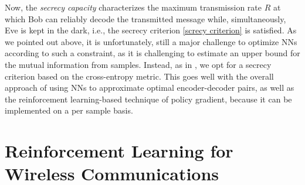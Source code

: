 \documentclass[conference, 10pt]{IEEEtran}
\begin{document}
Now, the \emph{secrecy capacity} characterizes the maximum transmission rate $R$ at which Bob can reliably decode the transmitted message while, simultaneously, Eve is kept in the dark, i.e., the secrecy criterion \eqref{screcy criterion} is satisfied. As we pointed out above, it is unfortunately, still a major challenge to optimize NNs according to such a constraint, as it is challenging to estimate an upper bound for the mutual information from samples. Instead, as in \cite{ICC_DL_Sec}, we opt for a secrecy criterion based on the cross-entropy metric. This goes well with the overall approach of using NNs to approximate optimal encoder-decoder pairs, as well as the reinforcement learning-based technique of policy gradient, because it can be implemented on a per sample basis. 



\section{Reinforcement Learning for Wireless Communications}
\label{sec:RL-WC}
\end{document}
